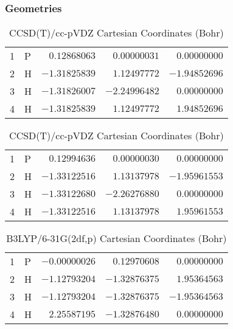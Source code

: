 \documentclass[10pt,oneside]{article}
\begin{document}
\clearpage

\subsection{}

\begin{table}[h!]
\subsubsection*{Geometries}
\begin{multicols}{2}
\centering
\caption{CCSD(T)/cc-pVTZ Cartesian Coordinates (Bohr)}
\begin{tabular}{llrrr}
\toprule
1  & P  & $ 0.12868063$ & $ 0.00000031$ & $ 0.00000000$ \\
2  & H  & $-1.31825839$ & $ 1.12497772$ & $-1.94852696$ \\
3  & H  & $-1.31826007$ & $-2.24996482$ & $ 0.00000000$ \\
4  & H  & $-1.31825839$ & $ 1.12497772$ & $ 1.94852696$ \\
\bottomrule
\end{tabular}
\caption{CCSD(T)/cc-pVDZ Cartesian Coordinates (Bohr)}
\begin{tabular}{llrrr}
\toprule
1  & P  & $ 0.12994636$ & $ 0.00000030$ & $ 0.00000000$ \\
2  & H  & $-1.33122516$ & $ 1.13137978$ & $-1.95961553$ \\
3  & H  & $-1.33122680$ & $-2.26276880$ & $ 0.00000000$ \\
4  & H  & $-1.33122516$ & $ 1.13137978$ & $ 1.95961553$ \\
\bottomrule
\end{tabular}
\end{multicols}
\end{table}

\begin{table}[h]
\centering
\caption{B3LYP/6-31G(2df,p) Cartesian Coordinates (Bohr)}
\begin{tabular}{llrrr}
\toprule
1  & P  & $-0.00000026$ & $ 0.12970608$ & $ 0.00000000$ \\
2  & H  & $-1.12793204$ & $-1.32876375$ & $ 1.95364563$ \\
3  & H  & $-1.12793204$ & $-1.32876375$ & $-1.95364563$ \\
4  & H  & $ 2.25587195$ & $-1.32876480$ & $ 0.00000000$ \\
\bottomrule
\end{tabular}
\end{table}
\end{document}
